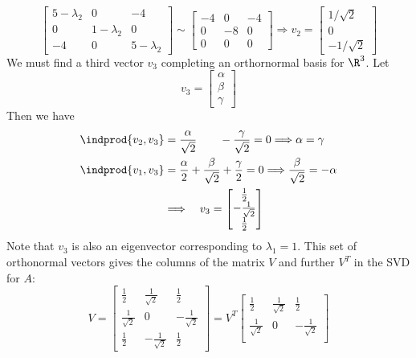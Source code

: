 \begin{enumerate}[a)]
$$
  \begin{bmatrix}
    5-\lambda_2 & 0 & -4 \\
    0 & 1-\lambda_2 & 0 \\
    -4 & 0 & 5-\lambda_2
  \end{bmatrix}
  \sim
  \begin{bmatrix}
    -4 & 0 & -4 \\
    0 & -8 & 0 \\
    0 & 0 & 0
  \end{bmatrix}
  \Rightarrow v_2=
  \begin{bmatrix}
    1/\sqrt{2} \\
    0 \\
    -1/\sqrt{2}
  \end{bmatrix}
$$
We must find a third vector $v_3$ completing an orthornormal basis for $\R^3$. Let
$$
v_3 =
  \begin{bmatrix}
    \alpha \\
    \beta \\
    \gamma
  \end{bmatrix}
$$
Then we have
  \begin{align*}
    \indprod{v_2, v_3} & = \frac{\alpha}{\sqrt{2}} \qquad -\frac{\gamma}{\sqrt{2}} = 0 \Longrightarrow \alpha = \gamma \\
    \indprod{v_1, v_3} & = \frac{\alpha}{2}+\frac{\beta}{\sqrt{2}}+ \frac{\gamma}{2} = 0 \Longrightarrow \frac{\beta}{\sqrt{2}} = -\alpha \\
     & \Longrightarrow \quad v_3 =
      \begin{bmatrix}
        \frac{1}{2} \\
         -\frac{1}{\sqrt{2}} \\
        \frac{1}{2}
      \end{bmatrix}
  \end{align*}
Note that $v_3$ is also an eigenvector corresponding to $\lambda_1=1$.
This set of orthonormal vectors gives the columns of the matrix $V$ and further $V^T$ in the SVD for $A$:
$$V=
\begin{bmatrix}
  \frac{1}{2}  & \frac{1}{\sqrt{2}} & \frac{1}{2} \\
  \frac{1}{\sqrt{2}} & 0 & -\frac{1}{\sqrt{2}} \\
  \frac{1}{2} & -\frac{1}{\sqrt{2}} & \frac{1}{2}
\end{bmatrix}
=V^T
\begin{bmatrix}
  \frac{1}{2}  & \frac{1}{\sqrt{2}} & \frac{1}{2} \\
  \frac{1}{\sqrt{2}} & 0 & -\frac{1}{\sqrt{2}} \\

\end{bmatrix}$$
\end{enumerate}
